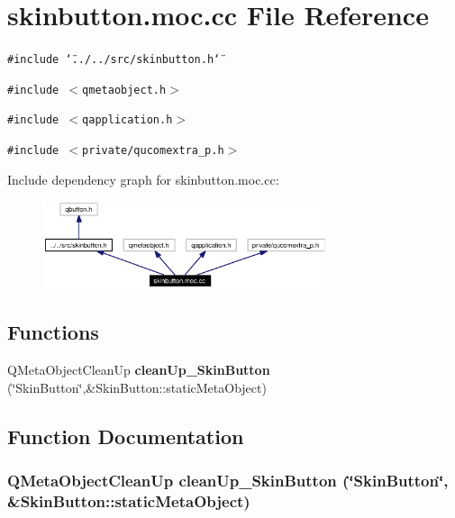 \section{skinbutton.moc.cc File Reference}
\label{skinbutton_8moc_8cc}


{\tt \#include \char`\"{}../../src/skinbutton.h\char`\"{}}\par
{\tt \#include $<$qmetaobject.h$>$}\par
{\tt \#include $<$qapplication.h$>$}\par
{\tt \#include $<$private/qucomextra\_\-p.h$>$}\par


Include dependency graph for skinbutton.moc.cc:\begin{figure}[H]
\begin{center}
\leavevmode
\includegraphics[width=236pt]{skinbutton_8moc_8cc__incl}
\end{center}
\end{figure}
\subsection*{Functions}
\begin{CompactItemize}
\item 
QMeta\-Object\-Clean\-Up {\bf clean\-Up\_\-Skin\-Button} (\char`\"{}Skin\-Button\char`\"{},\&Skin\-Button::static\-Meta\-Object)
\end{CompactItemize}


\subsection{Function Documentation}
\subsubsection{\setlength{\rightskip}{0pt plus 5cm}QMeta\-Object\-Clean\-Up clean\-Up\_\-Skin\-Button (\char`\"{}Skin\-Button\char`\"{}, \&Skin\-Button::static\-Meta\-Object)\hspace{0.3cm}{\tt  [static]}}\label{skinbutton_8moc_8cc_a0}


